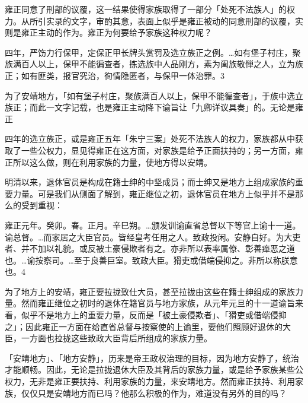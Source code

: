 雍正同意了刑部的议覆，这一结果使得家族取得了一部分「处死不法族人」的权力。从所引实录的文字，审酌其意，表面上似乎是雍正被动的同意刑部的议覆，实则是雍正主动的作为。雍正为何要给予家族这种权力呢？

\begin{BookQuote}
四年，严饬力行保甲，定保正甲长牌头赏罚及选立族正之例。…如有堡子村庄，聚族满百人以上，保甲不能徧查者，拣选族中人品刚方，素为阖族敬惮之人，立为族正；如有匪类，报官究治，徇情隐匿者，与保甲一体治罪。3
\end{BookQuote}

为了安靖地方，「如有堡子村庄，聚族满百人以上，保甲不能徧查者」，于族中选立族正；而此一文字记载，也是雍正主动降下谕旨让「九卿详议具奏」的。无论是雍正

\vfill
\begin{BookNotes}
\end{BookNotes}

\noindent 四年的选立族正，或是雍正五年「朱宁三案」处死不法族人的权力，家族都从中获取了一些公权力，显见得雍正在这方面，对家族是给予正面扶持的；另一方面，雍正所以这么做，则在利用家族的力量，使地方得以安靖。

明清以来，退休官员是构成在籍士绅的中坚成员；而士绅又是地方上组成家族的重要力量。可是我们从侧面了解到，雍正继位之初，退休官员在地方上似乎并不是那么的受到重视：

\begin{BookQuote}
雍正元年。癸卯。春。正月。辛巳朔。…颁发训谕直省总督以下等官上谕十一道。谕总督。…而家居之大臣官员。皆经皇考任用之人。致政投闲。安静自好。为大吏者、并不加以礼貌。或反被土豪侵欺者有之。亦非所以表率属僚、彰善瘅恶之道也。…谕按察司。…至于良善巨室。致政大臣。猾吏或借端侵抑之。非所以称朕意也。4
\end{BookQuote}

为了地方上的安靖，雍正要拉拢致仕大员，甚至拉拢由这些在籍士绅组成的家族力量。然而雍正继位之初时的退休在籍官员与地方家族，从元年元旦的十一道谕旨来看，似乎不是地方上的重要力量，反而是「被土豪侵欺者」、「猾吏或借端侵抑之」；因此雍正一方面在给直省总督与按察使的上谕里，要他们照顾好退休的大臣，一方面也拉拢这些致政大臣背后所组成的家族力量。

「安靖地方」、「地方安静」，历来是帝王政权治理的目标，因为地方安静了，统治才能顺畅。因此，无论是拉拢退休大臣及其背后的家族力量，或是给予家族某些公权力，无非是雍正要扶持、利用家族的力量，来安靖地方。然而雍正扶持、利用家族，仅仅只是安靖地方而已吗？他那么积极的作为，难道没有另外的目的吗？


